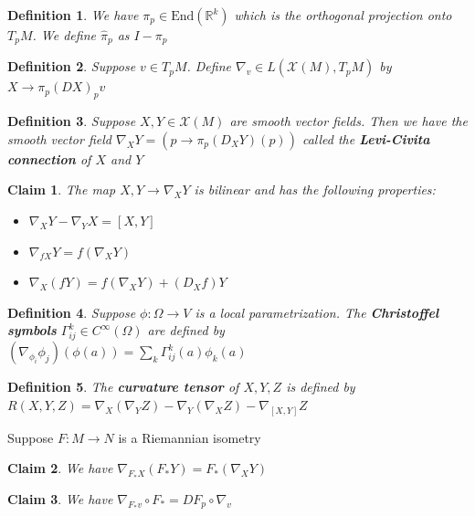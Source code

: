 \documentclass{article}
\newtheorem{definition}{Definition}
\newtheorem{claim}{Claim}
\begin{document}
\begin{definition}
    We have $\pi_p \in \text{End}(\mathbb{R}^k)$ which is the orthogonal projection onto $T_pM$. We define $\hat{\pi}_p$ as $I-\pi_p$
\end{definition}

\begin{definition}
    Suppose $v \in T_pM$. Define $\nabla_v \in L(\mathcal{X}(M),T_pM)$ by $X \to \pi_p (DX)_p v$
\end{definition}

\begin{definition}
    Suppose $X,Y \in \mathcal{X}(M)$ are smooth vector fields. Then we have the smooth vector field $\nabla_XY=(p \to \pi_p (D_XY)(p))$ called the \textbf{Levi-Civita connection} of $X$ and $Y$
\end{definition}

\begin{claim}
    The map $X,Y \to \nabla_XY$ is bilinear and has the following properties:
    \begin{itemize}
        \item $\nabla_XY-\nabla_YX = [X,Y]$
        \item $\nabla_{fX}Y=f(\nabla_XY)$
        \item $\nabla_X(fY)=f(\nabla_XY) + (D_Xf)Y$
    \end{itemize}
\end{claim}

\begin{definition}
    Suppose $\phi: \Omega \to V$ is a local parametrization. The \textbf{Christoffel symbols} $\Gamma_{ij}^k \in C^\infty(\Omega)$ are defined by $(\nabla_{\phi_i}\phi_j)(\phi(a)) = \sum_k \Gamma_{ij}^k(a) \phi_k(a)$
\end{definition}

\begin{definition}
    The \textbf{curvature tensor} of $X,Y,Z$ is defined by $R(X,Y,Z)=\nabla_X(\nabla_YZ)-\nabla_Y(\nabla_XZ)-\nabla_{[X,Y]}Z$
\end{definition}

Suppose $F:M \to N$ is a Riemannian isometry

\begin{claim}
    We have $\nabla_{F_*X}(F_*Y)=F_*(\nabla_XY)$
\end{claim}

\begin{claim}
    We have $\nabla_{F_*v} \circ F_* = DF_p \circ \nabla_v$
\end{claim}
\end{document}
